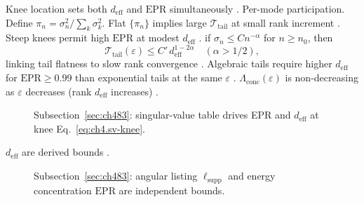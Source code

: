 Knee location sets both \(d_{\mathrm{eff}}\) and \(\mathrm{EPR}\) simultaneously \cite{hansen1988}.
Per-mode participation. Define \(\pi_{n}=\sigma_{n}^{2}/\sum_{k}\sigma_{k}^{2}\). Flat \(\{\pi_{n}\}\) implies large \(\mathcal{T}_{\mathrm{tail}}\) at small rank increment
\cite{devaney2004}. Steep knees permit high \(\mathrm{EPR}\) at modest \(d_{\mathrm{eff}}\) \cite{harrington2001}.
if \(\sigma_{n}\le C n^{-\alpha}\) for \(n\ge n_{0}\), then
\begin{equation}
\label{eq:ch4.sv-decay-bound}
\mathcal{T}_{\mathrm{tail}}(\varepsilon)\le C'\,d_{\mathrm{eff}}^{1-2\alpha}\quad(\alpha>1/2),
\end{equation}
linking tail flatness to slow rank convergence \cite{hansen1988}. Algebraic tails require higher \(d_{\mathrm{eff}}\) for
\(\mathrm{EPR}\ge0.99\) than exponential tails at the same \(\varepsilon\) \cite{stratton1941}.
\label{lem:ch4.conc-monotone}
\(\Lambda_{\mathrm{conc}}(\varepsilon)\) is non-decreasing as \(\varepsilon\) decreases (rank \(d_{\mathrm{eff}}\) increases)
\cite{harrington2001}.
\begin{figure}[t]
\centering
{}
\caption{Subsection~\ref{sec:ch483}: singular-value table drives EPR and \(d_{\mathrm{eff}}\) at knee Eq.~\eqref{eq:ch4.sv-knee}.}
\label{fig:ch4.spectral-concentration}
\end{figure}
\(d_{\mathrm{eff}}\) are derived bounds \cite{harrington2001}.
\begin{figure}[t]
\centering
{}
\caption{Subsection~\ref{sec:ch483}: angular listing \(\ell_{\mathrm{supp}}\) and energy concentration \(\mathrm{EPR}\) are independent bounds.}
\label{fig:ch4.listing-concentration-split}
\end{figure}
